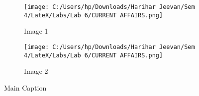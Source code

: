 \documentclass{article}
\begin{document}
	\begin{figure}[h!]
		\centering
		\begin{subfigure}[b]{0.4\linewidth}
			\texttt{[image: C:/Users/hp/Downloads/Harihar Jeevan/Sem 4/LateX/Labs/Lab 6/CURRENT AFFAIRS.png]}
			\caption{Image 1}
		\end{subfigure}
		\hspace{0.1\linewidth}
		\begin{subfigure}[b]{0.4\linewidth}
			\texttt{[image: C:/Users/hp/Downloads/Harihar Jeevan/Sem 4/LateX/Labs/Lab 6/CURRENT AFFAIRS.png]}
			\caption{Image 2}
		\end{subfigure}
		\caption{Main Caption}
	\end{figure}
\end{document}
